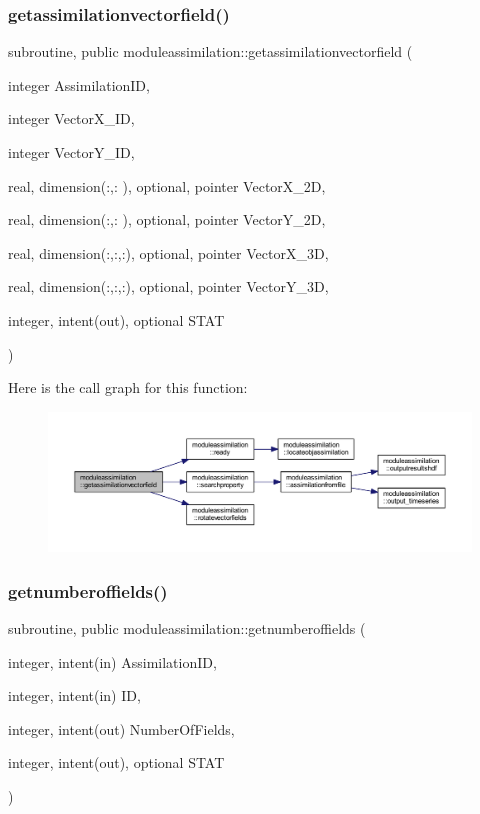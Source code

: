 \subsubsection{\texorpdfstring{getassimilationvectorfield()}{getassimilationvectorfield()}}
{\footnotesize\ttfamily subroutine, public moduleassimilation\+::getassimilationvectorfield (\begin{DoxyParamCaption}\item[{integer}]{Assimilation\+ID,  }\item[{integer}]{Vector\+X\+\_\+\+ID,  }\item[{integer}]{Vector\+Y\+\_\+\+ID,  }\item[{real, dimension(\+:,\+:  ), optional, pointer}]{Vector\+X\+\_\+2D,  }\item[{real, dimension(\+:,\+:  ), optional, pointer}]{Vector\+Y\+\_\+2D,  }\item[{real, dimension(\+:,\+:,\+:), optional, pointer}]{Vector\+X\+\_\+3D,  }\item[{real, dimension(\+:,\+:,\+:), optional, pointer}]{Vector\+Y\+\_\+3D,  }\item[{integer, intent(out), optional}]{S\+T\+AT }\end{DoxyParamCaption})}

Here is the call graph for this function\+:\nopagebreak
\begin{figure}[H]
\begin{center}
\leavevmode
\includegraphics[width=350pt]{namespacemoduleassimilation_a3f99df6f8207db00fe69fa4d172335b1_cgraph}
\end{center}
\end{figure}
\mbox{\label{namespacemoduleassimilation_aea7807de0a1c100aea360d7f4a30e2e5}} 
\subsubsection{\texorpdfstring{getnumberoffields()}{getnumberoffields()}}
{\footnotesize\ttfamily subroutine, public moduleassimilation\+::getnumberoffields (\begin{DoxyParamCaption}\item[{integer, intent(in)}]{Assimilation\+ID,  }\item[{integer, intent(in)}]{ID,  }\item[{integer, intent(out)}]{Number\+Of\+Fields,  }\item[{integer, intent(out), optional}]{S\+T\+AT }\end{DoxyParamCaption})}


